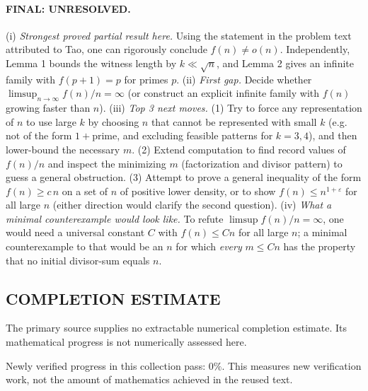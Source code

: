 \paragraph{FINAL: UNRESOLVED.}
(i) \emph{Strongest proved partial result here.} Using the statement in the problem text attributed to Tao, one can rigorously conclude $f(n)\neq o(n)$. Independently, Lemma 1 bounds the witness length by $k\ll \sqrt{n}$, and Lemma 2 gives an infinite family with $f(p+1)=p$ for primes $p$.
(ii) \emph{First gap.} Decide whether $\limsup_{n\to\infty} f(n)/n=\infty$ (or construct an explicit infinite family with $f(n)$ growing faster than $n$).
(iii) \emph{Top 3 next moves.} (1) Try to force any representation of $n$ to use large $k$ by choosing $n$ that cannot be represented with small $k$ (e.g. not of the form $1+$prime, and excluding feasible patterns for $k=3,4$), and then lower-bound the necessary $m$. (2) Extend computation to find record values of $f(n)/n$ and inspect the minimizing $m$ (factorization and divisor pattern) to guess a general obstruction. (3) Attempt to prove a general inequality of the form $f(n)\ge c\,n$ on a set of $n$ of positive lower density, or to show $f(n)\le n^{1+\varepsilon}$ for all large $n$ (either direction would clarify the second question).
(iv) \emph{What a minimal counterexample would look like.} To refute $\limsup f(n)/n=\infty$, one would need a universal constant $C$ with $f(n)\le Cn$ for all large $n$; a minimal counterexample to that would be an $n$ for which \emph{every} $m\le Cn$ has the property that no initial divisor-sum equals $n$.




\subsection*{COMPLETION ESTIMATE}
The primary source supplies no extractable numerical completion estimate. Its mathematical progress is not numerically assessed here.

Newly verified progress in this collection pass: $0\%$. This measures new verification work, not the amount of mathematics achieved in the reused text.
